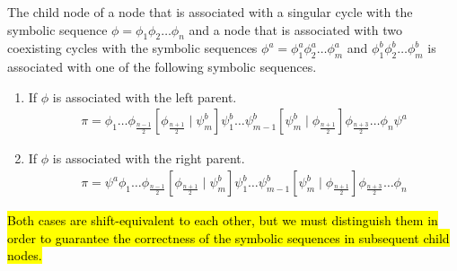 \begin{theorem}
	\label{theorem:child.symbolic.2}
	The child node of a node that is associated with a singular cycle with the symbolic sequence $\phi = \phi_1\phi_2 \dots \phi_n$ and a node that is associated with two coexisting cycles with the symbolic sequences $\phi^a = \phi^a_1\phi^a_2 \dots \phi^a_m$ and $\phi^b_1\phi^b_2 \dots \phi^b_m$ is associated with one of the following symbolic sequences.
	\begin{enumerate}
		\item If $\phi$ is associated with the left parent.
		      \begin{align}
			      \pi =
			      \phi_1 \dots \phi_{\frac{n-1}{2}} \left[\phi_{\frac{n+1}{2}} \mid \psi^b_m\right]
			      \psi^b_1 \dots \psi^b_{m-1} \left[\psi^b_m \mid \phi_{\frac{n+1}{2}}\right]
			      \phi_{\frac{n+3}{2}} \dots \phi_n \psi^a
		      \end{align}
		\item If $\phi$ is associated with the right parent.
		      \begin{align}
			      \pi =
			      \psi^a \phi_1 \dots \phi_{\frac{n-1}{2}} \left[\phi_{\frac{n+1}{2}} \mid \psi^b_m\right]
			      \psi^b_1 \dots \psi^b_{m-1} \left[\psi^b_m \mid \phi_{\frac{n+1}{2}}\right]
			      \phi_{\frac{n+3}{2}} \dots \phi_n
		      \end{align}
	\end{enumerate}
	\hl{
		Both cases are shift-equivalent to each other, but we must distinguish them in order to guarantee the correctness of the symbolic sequences in subsequent child nodes.
	}
\end{theorem}

